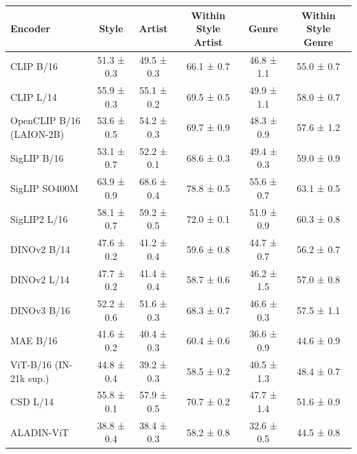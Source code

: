 \begin{tabular}{lccccc}
\toprule
Encoder & Style & Artist & Within Style Artist & Genre & Within Style Genre \\
\midrule
CLIP B/16 & 51.3 ± 0.3 & 49.5 ± 0.3 & 66.1 ± 0.7 & 46.8 ± 1.1 & 55.0 ± 0.7 \\
CLIP L/14 & 55.9 ± 0.3 & 55.1 ± 0.2 & 69.5 ± 0.5 & 49.9 ± 1.1 & 58.0 ± 0.7 \\
OpenCLIP B/16 (LAION-2B) & 53.6 ± 0.5 & 54.2 ± 0.3 & 69.7 ± 0.9 & 48.3 ± 0.9 & 57.6 ± 1.2 \\
SigLIP B/16 & 53.1 ± 0.7 & 52.2 ± 0.1 & 68.6 ± 0.3 & 49.4 ± 0.3 & 59.0 ± 0.9 \\
SigLIP SO400M & 63.9 ± 0.9 & 68.6 ± 0.4 & 78.8 ± 0.5 & 55.6 ± 0.7 & 63.1 ± 0.5 \\
SigLIP2 L/16 & 58.1 ± 0.7 & 59.2 ± 0.5 & 72.0 ± 0.1 & 51.9 ± 0.9 & 60.3 ± 0.8 \\
DINOv2 B/14 & 47.6 ± 0.2 & 41.2 ± 0.4 & 59.6 ± 0.8 & 44.7 ± 0.7 & 56.2 ± 0.7 \\
DINOv2 L/14 & 47.7 ± 0.2 & 41.4 ± 0.4 & 58.7 ± 0.6 & 46.2 ± 1.5 & 57.0 ± 0.8 \\
DINOv3 B/16 & 52.2 ± 0.6 & 51.6 ± 0.3 & 68.3 ± 0.7 & 46.6 ± 0.3 & 57.5 ± 1.1 \\
MAE B/16 & 41.6 ± 0.2 & 40.4 ± 0.3 & 60.4 ± 0.6 & 36.6 ± 0.9 & 44.6 ± 0.9 \\
ViT-B/16 (IN-21k sup.) & 44.8 ± 0.4 & 39.2 ± 0.3 & 58.5 ± 0.2 & 40.5 ± 1.3 & 48.4 ± 0.7 \\
CSD L/14 & 55.8 ± 0.1 & 57.9 ± 0.5 & 70.7 ± 0.2 & 47.7 ± 1.4 & 51.6 ± 0.9 \\
ALADIN-ViT & 38.8 ± 0.4 & 38.4 ± 0.3 & 58.2 ± 0.8 & 32.6 ± 0.5 & 44.5 ± 0.8 \\
\bottomrule
\end{tabular}
